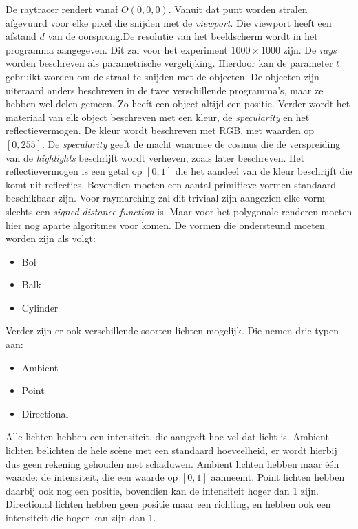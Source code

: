 \documentclass[12pt, a4paper]{article}
\begin{document}
De raytracer rendert vanaf $O(0,0,0)$. Vanuit dat punt worden stralen afgevuurd voor elke pixel die snijden met de \textit{viewport}. Die viewport heeft een afstand $d$ van de oorsprong.De resolutie van het beeldscherm wordt in het programma aangegeven. Dit zal voor het experiment $1000\times 1000$ zijn. De \emph{rays} worden beschreven als parametrische vergelijking. Hierdoor kan de parameter \(t\) gebruikt worden om de straal te snijden met de objecten. De objecten zijn uiteraard anders beschreven in de twee verschillende programma's, maar ze hebben wel delen gemeen. Zo heeft een object altijd een positie. Verder wordt het materiaal van elk object beschreven met een kleur, de \emph{specularity} en het reflectievermogen. De kleur wordt beschreven met RGB, met waarden op \([0, 255]\). De \emph{specularity} geeft de macht waarmee de cosinus die de verspreiding van de \emph{highlights} beschrijft wordt verheven, zoals later beschreven. Het reflectievermogen is een getal op \([0, 1]\) die het aandeel van de kleur beschrijft die komt uit reflecties. Bovendien moeten een aantal primitieve vormen standaard beschikbaar zijn. Voor raymarching zal dit triviaal zijn aangezien elke vorm slechts een \emph{signed distance function} is. Maar voor het polygonale renderen moeten hier nog aparte algoritmes voor komen. De vormen die ondersteund moeten worden zijn als volgt:
\begin{itemize}
	\item Bol
	\item Balk
	\item Cylinder
\end{itemize}

Verder zijn er ook verschillende soorten lichten mogelijk. Die nemen drie typen aan:
\begin{itemize}
	\item Ambient
	\item Point
	\item Directional
\end{itemize}
Alle lichten hebben een intensiteit, die aangeeft hoe vel dat licht is. Ambient lichten belichten de hele scène met een standaard hoeveelheid, er wordt hierbij dus geen rekening gehouden met schaduwen. Ambient lichten hebben maar één waarde: de intensiteit, die een waarde op \([0, 1]\) aanneemt. Point lichten hebben daarbij ook nog een positie, bovendien kan de intensiteit hoger dan 1 zijn. Directional lichten hebben geen positie maar een richting, en hebben ook een intensiteit die hoger kan zijn dan 1.
\end{document}

